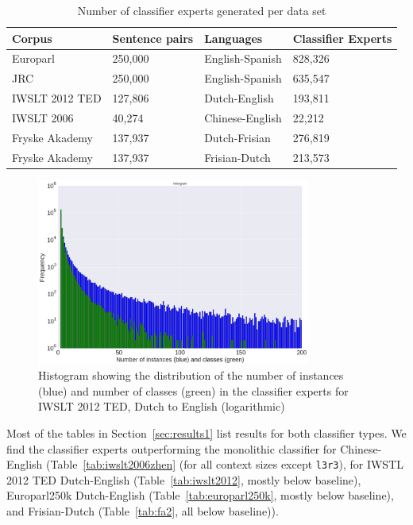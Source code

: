 \documentclass[smallextended]{svjour3}       %
\theoremstyle{break}
\begin{document}
\begin{table}
\begin{tabular}{|lll|l|}
\hline
\textbf{Corpus} & \textbf{Sentence pairs} & \textbf{Languages} & \textbf{Classifier Experts} \\
\hline
Europarl & 250,000 & English-Spanish & 828,326 \\
JRC & 250,000 & English-Spanish & 635,547 \\
IWSLT 2012 TED & 127,806 & Dutch-English & 193,811 \\
IWSLT 2006 & 40,274 & Chinese-English & 22,212 \\
Fryske Akademy & 137,937 & Dutch-Frisian & 276,819 \\
Fryske Akademy & 137,937 & Frisian-Dutch & 213,573 \\
\hline
\end{tabular}
\caption{Number of classifier experts generated per data set}
\label{tab:expertcount}
\end{table}


\begin{figure}
\begin{center}
\includegraphics[width=90.00mm]{classifierhistogram.png}
\caption{Histogram showing the distribution of the number of instances (blue) and number of classes (green) in the classifier experts for IWSLT 2012 TED, Dutch to English (logarithmic)}
\label{fig:histogram}
\end{center}
\end{figure}

Most of the tables in Section~\ref{sec:results1} list results for both classifier
types.  We find the classifier experts outperforming the monolithic classifier
for Chinese-English (Table~\ref{tab:iwslt2006zhen} (for all context sizes except
\texttt{l3r3}), for  IWSTL 2012 TED Dutch-English (Table~\ref{tab:iwslt2012},
mostly below baseline), Europarl250k Dutch-English
(Table~\ref{tab:europarl250k}, mostly below baseline), and Frisian-Dutch
(Table~\ref{tab:fa2}, all below baseline)).
\end{document}
